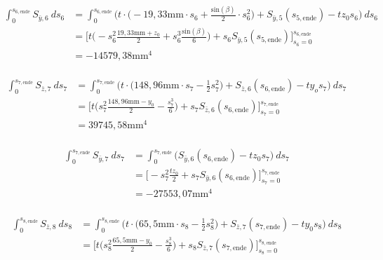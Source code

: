 \begin{itemize}
\begin{equation}
\begin{split}
			\int_{0}^{s_{6,\mathrm{ende}}} S_{\bar y,6}\ ds_6 &= \int_{0}^{s_{6,\mathrm{ende}}} \bigg(t\cdot\bigg(-19,33\mathrm{mm}\cdot s_6 + \frac{\mathrm{sin}(\beta)}{2}\cdot s^2_6\bigg) + S_{\bar y,5}(s_{5,\mathrm{ende}})-tz_0s_6\bigg)\ ds_6\\\
			&=\bigg[t\bigg(-s_6^2\frac{19,33\mathrm{mm}+z_0}{2}+s_6^3\frac{\mathrm{sin}(\beta)}{6}\bigg)+ s_6S_{\bar y,5}(s_{5,\mathrm{ende}})\bigg]_{s_6=0}^{s_{6,\mathrm{ende}}}\\\
			&=-14579,38\mathrm{mm}^4
		\end{split}
	\end{equation}\\
	\begin{equation}
		\begin{split}
			\int_{0}^{s_{7,\mathrm{ende}}} S_{\bar z,7}\ ds_7 &= \int_{0}^{s_{7,\mathrm{ende}}}\bigg(t\cdot\bigg(148,96\mathrm{mm}\cdot s_7-\frac{1}{2}s^2_7\bigg) + S_{\bar z,6}(s_{6,\mathrm{ende}})-ty_os_7\bigg)\ ds_7\\\
			&=\bigg[t\bigg(s_7^2\frac{148,96\mathrm{mm}-y_0}{2}-\frac{s_7^3}{6}\bigg)+s_7S_{\bar z,6}(s_{6,\mathrm{ende}})\bigg]_{s_7=0}^{s_{7,\mathrm{ende}}}\\\
			&=39745,58\mathrm{mm}^4
		\end{split}
	\end{equation}\\
	\begin{equation}
		\begin{split}
			\int_{0}^{s_{7,\mathrm{ende}}} S_{\bar y,7}\ ds_7 &= \int_{0}^{s_{7,\mathrm{ende}}} \bigg(S_{\bar y,6}(s_{6,\mathrm{ende}})-tz_0s_7\bigg)\ ds_7\\\
			&=\bigg[-s_7^2\frac{tz_0}{2}+s_7S_{\bar y,6}(s_{6,\mathrm{ende}})\bigg]_{s_7=0}^{s_{7,\mathrm{ende}}}\\\
			&=-27553,07\mathrm{mm}^4
		\end{split}
	\end{equation}\\
	\begin{equation}
		\begin{split}
			\int_{0}^{s_{8,\mathrm{ende}}} S_{\bar z,8}\ ds_8 &= \int_{0}^{s_{8,\mathrm{ende}}} \bigg(t\cdot\bigg(65,5\mathrm{mm}\cdot s_8-\frac{1}{2}s^2_8\bigg) + S_{\bar z,7}(s_{7,\mathrm{ende}})-ty_0s_8\bigg)\ ds_8\\\
			&=\bigg[t\bigg(s_8^2\frac{65,5\mathrm{mm}-y_0}{2}-\frac{s_8^3}{6}\bigg)+s_8S_{\bar z,7}(s_{7,\mathrm{ende}})\bigg]_{s_8=0}^{s_{8,\mathrm{ende}}}\\\

\end{split}
\end{equation}
\end{itemize}
